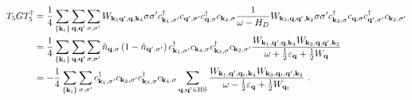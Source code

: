 \documentclass{revtex4-2}
\begin{document}
\begin{equation}\begin{aligned}
	T_5 G T_5^\dagger &= \frac{1}{4}\sum_{\left\{ {\bf k}_i \right\} }\sum_{{\bf q},{\bf q}^\prime}\sum_{\sigma,\sigma^\prime} W_{{\bf k}_1 {\bf q}^\prime, {\bf q}, {\bf k}_4} \sigma\sigma^\prime c^\dagger_{{\bf k}_1,\sigma^\prime}c_{{\bf q}^\prime,\sigma^\prime}c^\dagger_{{\bf q},\sigma}c_{{\bf k}_4,\sigma} \frac{1}{\omega - H_D}W_{{\bf k}_3, {\bf q}, {\bf q}^\prime, {\bf k}_2} \sigma\sigma^\prime c^\dagger_{{\bf k}_3,\sigma}c_{{\bf q},\sigma}c^\dagger_{{\bf q}^\prime,\sigma^\prime}c_{{\bf k}_2,\sigma^\prime}\\
		  &= \frac{1}{4}\sum_{\left\{ {\bf k}_i \right\} }\sum_{{\bf q},{\bf q}^\prime}\sum_{\sigma,\sigma^\prime} \hat n_{{\bf q},\sigma} \left(1 - \hat n_{{\bf q}^\prime,\sigma^\prime}\right) c^\dagger_{{\bf k}_1,\sigma^\prime}c_{{\bf k}_4,\sigma}c^\dagger_{{\bf k}_3,\sigma}c_{{\bf k}_2,\sigma^\prime} \frac{W_{{\bf k}_1, {\bf q}^\prime, {\bf q},{\bf k}_4} W_{{\bf k}_3, {\bf q}, {\bf q}^\prime, {\bf k}_2}}{\omega + \frac{1}{2}\varepsilon_{{\bf q}}  + \frac{1}{2}W_{{\bf q}}}  \\
		  &= -\frac{1}{4}\sum_{\left\{ {\bf k}_i \right\} }\sum_{\sigma,\sigma^\prime} c^\dagger_{{\bf k}_1,\sigma^\prime} c_{{\bf k}_2,\sigma^\prime} c^\dagger_{{\bf k}_3,\sigma} c_{{\bf k}_4,\sigma} \sum_{{\bf q}, {\bf q}^\prime \in \text{HS}}\frac{W_{{\bf k}_1, {\bf q}^\prime, {\bf q}_t,{\bf k}_4} W_{{\bf k}_3, {\bf q}_t, {\bf q}^\prime, {\bf k}_2}}{\omega - \frac{1}{2}\varepsilon_{{\bf q}}  + \frac{1}{2}W_{{\bf q}_t}}~.
\end{aligned}\end{equation}
\end{document}

